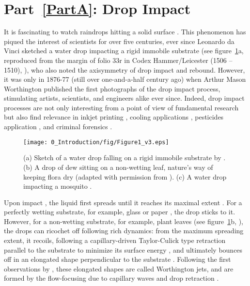 \section*{Part~\ref{PartA}: Drop Impact}

It is fascinating to watch raindrops hitting a solid surface \citep{kim2020raindrop, lohse-2020-pnas}. This phenomenon has piqued the interest of scientists for over five centuries, ever since Leonardo da Vinci sketched a water drop impacting a rigid immobile substrate (see figure~\ref{Ch0::Fig1}a, reproduced from the margin of folio 33r in Codex Hammer/Leicester (1506 -- 1510), \citep{da1508notebooks}), who also noted the axisymmetry of drop impact and rebound. However, it was only in 1876-77 (still over one-and-a-half century ago) when Arthur Mason Worthington \citep{worthington1877xxviii, worthington1877second} published the first photographs of the drop impact process, stimulating artists, scientists, and engineers alike ever since. Indeed, drop impact processes are not only interesting from a point of view of fundamental research but also find relevance in inkjet printing \cite{lohse2022fundamental}, cooling applications \cite{kim2007spray, shiri2017heat, jowkar2019rebounding}, pesticides application \cite{he2021optimization, hoffman2021controlling}, and criminal forensics \cite{smith2018influence}.

\begin{figure}
	\centering
	\texttt{[image: 0\_Introduction/fig/Figure1\_v3.eps]}
	\caption{(a) Sketch of a water drop falling on a rigid immobile substrate by \citet{da1508notebooks}. (b) A drop of dew sitting on a non-wetting leaf, nature's way of keeping flora dry (adapted with permission from \citet{carolaThesis}). (c) A water drop impacting  a mosquito \citep{dickerson2012mosquitoes}.}
	\label{Ch0::Fig1}
\end{figure}

Upon impact \citep{wagner1932stoss}, the liquid first spreads \citep{philippi2016, Gordillo2018} until it reaches its maximal extent \citep{clanet2004,laan2014maximum, wildeman2016spreading, gordillo2019theory}. For a perfectly wetting substrate, for example, glass or paper \citep{lohse2022fundamental}, the drop sticks to it. However, for a non-wetting substrate, for example, plant leaves (see figure~\ref{Ch0::Fig1}b, \citep{neinhuis1997characterization, quere2008wetting, carolaThesis}), the drops can ricochet off following rich dynamics: from the maximum spreading extent, it recoils, following a capillary-driven Taylor-Culick type retraction parallel to the substrate to minimize its surface energy \citep{taylor-1959-procrsoclonda, culick-1960-japplphys, bartolo2005retraction, pierson2020revisiting, deka2020revisiting, sanjay2022taylor}, and ultimately bounces off in an elongated shape perpendicular to the substrate \citep{richard2000bouncing, yarin2006drop, josserand2016drop}. Following the first observations by \citet{worthington1877xxviii, worthington1877second}, these elongated shapes are called Worthington jets, and are formed by the flow-focusing due to capillary waves \citep{renardy2003pyramidal, bartolo2006singular} and drop retraction \citep{bartolo2005retraction}.

